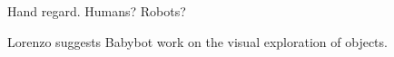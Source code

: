 
Hand regard.  Humans?  Robots?

Lorenzo suggests Babybot work on the visual exploration of objects.
